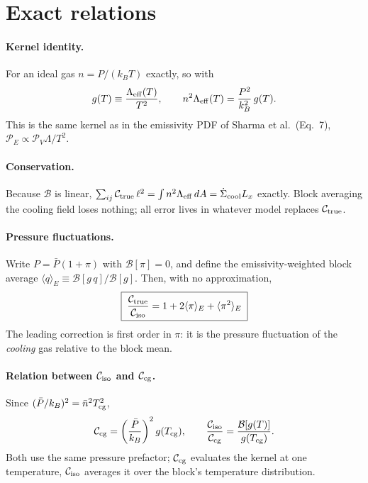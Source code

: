 \documentclass[11pt]{article}
\newcommand{\B}{\mathcal{B}}
\newcommand{\Leff}{\Lambda_{\rm eff}}
\newcommand{\Ctrue}{\mathcal{C}_{\rm true}}
\newcommand{\Ccg}{\mathcal{C}_{\rm cg}}
\newcommand{\Ciso}{\mathcal{C}_{\rm iso}}
\newcommand{\Tcg}{T_{\rm cg}}
\begin{document}
\section{Exact relations}

\paragraph{Kernel identity.} For an ideal gas $n=P/(k_BT)$ exactly, so with
\begin{equation}
g(T)\equiv \frac{\Leff(T)}{T^2},\qquad n^2\Leff(T)=\frac{P^2}{k_B^2}\,g(T).
\end{equation}
This is the same kernel as in the emissivity PDF of Sharma et al.\ (Eq.~7), $\mathcal P_E\propto\mathcal P_V\Lambda/T^2$.

\paragraph{Conservation.} Because $\B$ is linear, $\sum_{ij}\Ctrue\,\ell^2=\int n^2\Leff\,dA=\dot\Sigma_{\rm cool}L_x$ exactly. Block averaging the cooling field loses nothing; all error lives in whatever model replaces $\Ctrue$.

\paragraph{Pressure fluctuations.} Write $P=\bar P(1+\pi)$ with $\B[\pi]=0$, and define the emissivity-weighted block average $\langle q\rangle_E\equiv\B[g\,q]/\B[g]$. Then, with no approximation,
\begin{equation}
\boxed{\;\frac{\Ctrue}{\Ciso}=1+2\langle\pi\rangle_E+\langle\pi^2\rangle_E\;}
\label{eq:isoerr}
\end{equation}
The leading correction is first order in $\pi$: it is the pressure fluctuation of the \emph{cooling} gas relative to the block mean.

\paragraph{Relation between $\Ciso$ and $\Ccg$.} Since $(\bar P/k_B)^2=\bar n^2\Tcg^2$,
\begin{equation}
\Ccg=\left(\frac{\bar P}{k_B}\right)^{2} g(\Tcg),\qquad
\frac{\Ciso}{\Ccg}=\frac{\B[g(T)]}{g(\Tcg)} .
\end{equation}
Both use the same pressure prefactor; $\Ccg$ evaluates the kernel at one temperature, $\Ciso$ averages it over the block's temperature distribution.
\end{document}
